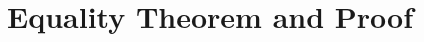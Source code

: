 \newcommand*{\createsection}[2]{
  \section{#1}
  
  \label{sec:#2}
}

\createsection{Equality Theorem and Proof}{equality-thm-pf}